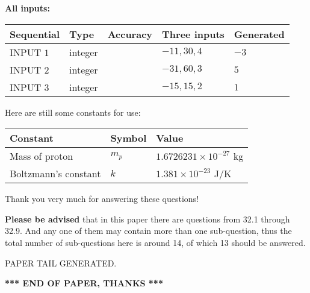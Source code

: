 \documentclass[12pt]{article}
\begin{document}
   
   
   
\noindent\vspace{0.1in}\hspace{-0.08in} {\textbf{\Large{All inputs: }}}
   
   
  
  
\noindent\begin{tabular}{|l|l|l|l|l|}
\hline
 Sequential & Type & Accuracy & Three inputs & Generated \\ 
\hline
 
 
  INPUT $           1$ & integer &  & $
 -11
 , 
 30
 , 
 4
 $ & $ -3 $ 
 \\  \hline  
 
 
  INPUT $           2$ & integer &  & $
 -31
 , 
 60
 , 
 3
 $ & $ 5 $ 
 \\  \hline  
 
 
  INPUT $           3$ & integer &  & $
 -15
 , 
 15
 , 
 2
 $ & $ 1 $ 
 \\  \hline  
 \end{tabular}
   
   
   
   
   
   
 \vspace{0.2in}
Here are still some constants for use:
 
 
\noindent\begin{tabular}{|l|l|l|}
\hline
Constant & Symbol & Value \\
\hline
 
Mass of proton &
$m_p$ &
 $ 1.6726231 \times 10^{-27} $
kg \\
\hline
 
Boltzmann's constant &
$k$ &
 $ 1.381 \times 10^{-23} $
J/K \\
\hline
 
\end{tabular}
 
Thank you very much for answering these questions!
 
{\textbf{\large{Please be advised}}} that in this paper there are questions from
32.1 through
32.9.
And any one of them may contain more than one sub-question, thus the total number
of sub-questions here is around 14, of which
13 should be answered.
 
   
   
\vspace{2.0in} PAPER TAIL GENERATED.
   
   
   
   
\vspace{1.0in} 
{\textbf{\large{ *** END OF PAPER, THANKS *** }}} 
   
\end{document}

